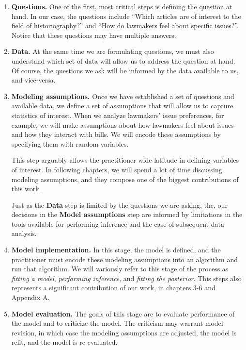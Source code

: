 \begin{enumerate}
\item \textbf{Questions.} One of the first, most critical steps is
  defining the question at hand.  In our case, the questions include
  ``Which articles are of interest to the field of historiography?''
  and ``How do lawmakers feel about specific issues?''. Notice that
  these questions may have multiple answers.

\item \textbf{Data.} At the same time we are formulating questions, we
  must also understand which set of data will allow us to address the
  question at hand.  Of course, the questions we ask will be informed
  by the data available to us, and vice-versa.

\item \textbf{Modeling assumptions.} Once we have established a set of
  questions and available data, we define a set of assumptions that
  will allow us to capture statistics of interest.  When we analyze
  lawmakers' issue preferences, for example, we will make assumptions
  about how lawmakers feel about issues and how they interact with
  bills.  We will encode these assumptions by specifying them with
  random variables.

  This step arguably allows the practitioner wide latitude in defining
  variables of interest.  In following chapters, we will spend a lot
  of time discussing modeling assumptions, and they compose one of the
  biggest contributions of this work.

  Just as the \textbf{Data} step is limited by the questions we are
  asking, the, our decisions in the \textbf{Model assumptions} step
  are informed by limitations in the tools available for performing
  inference and the ease of subsequent data analysis.

  \item \textbf{Model implementation.} In this stage, the model is
  defined, and the practitioner must encode these modeling assumptions
  into an algorithm and run that algorithm.  We will variously refer
  to this stage of the process as \emph{fitting a model},
  \emph{performing inference}, and \emph{fitting the posterior}.  This
  steps also represents a significant contribution of our work, in
  chapters 3-6 and Appendix A.

  \item \textbf{Model evaluation.} The goals of this stage are to
    evaluate performance of the model and to criticize the model.
    The criticism may warrant model revision, in which case the
    modeling assumptions are adjusted, the model is refit, and the
    model is re-evaluated.


\end{enumerate}
